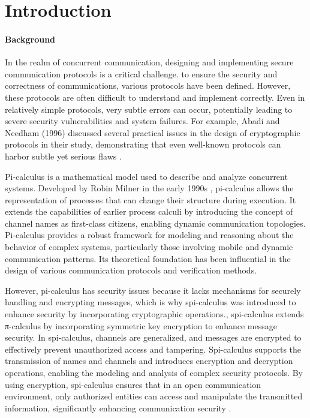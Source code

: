 \documentclass[master,english]{kuisthesis}
\begin{document}
\tableofcontents				%

\section{Introduction}\label{sec-intro}	

\paragraph{Background}

In the realm of concurrent communication, designing and implementing secure communication protocols is a critical challenge. to ensure the security and correctness of communications, various protocols have been defined. However, these protocols are often difficult to understand and implement correctly. Even in relatively simple protocols, very subtle errors can occur, potentially leading to severe security vulnerabilities and system failures. For example, Abadi and Needham (1996) discussed several practical issues in the design of cryptographic protocols in their study, demonstrating that even well-known protocols can harbor subtle yet serious flaws \cite{?}.


Pi-calculus is a mathematical model used to describe and analyze concurrent systems. Developed by Robin Milner in the early 1990s \cite{?}, pi-calculus allows the representation of processes that can change their structure during execution. It extends the capabilities of earlier process calculi by introducing the concept of channel names as first-class citizens, enabling dynamic communication topologies. Pi-calculus provides a robust framework for modeling and reasoning about the behavior of complex systems, particularly those involving mobile and dynamic communication patterns. Its theoretical foundation has been influential in the design of various communication protocols and verification methods.

However, pi-calculus has security issues because it lacks mechanisms for securely handling and encrypting messages, which is why spi-calculus was introduced to enhance security by incorporating cryptographic operations., spi-calculus extends π-calculus by incorporating symmetric key encryption to enhance message security\cite{?}. In spi-calculus, channels are generalized, and messages are encrypted to effectively prevent unauthorized access and tampering. Spi-calculus supports the transmission of names and channels and introduces encryption and decryption operations, enabling the modeling and analysis of complex security protocols. By using encryption, spi-calculus ensures that in an open communication environment, only authorized entities can access and manipulate the transmitted information, significantly enhancing communication security \cite{?}.
\end{document}
